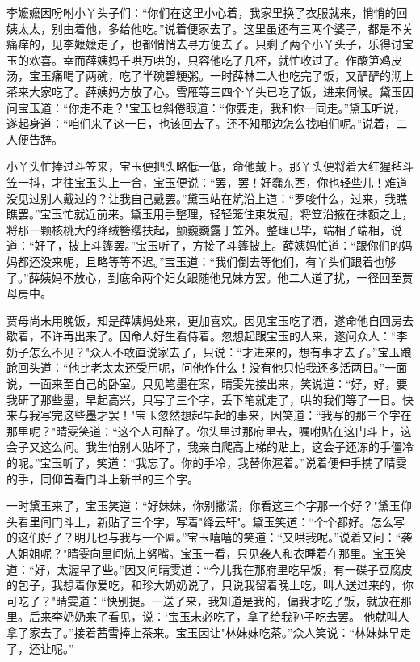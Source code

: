 李嬷嬷因吩咐小丫头子们：“你们在这里小心着，我家里换了衣服就来，悄悄的回姨太太，别由着他，多给他吃。”说着便家去了。这里虽还有三两个婆子，都是不关痛痒的，见李嬷嬷走了，也都悄悄去寻方便去了。只剩了两个小丫头子，乐得讨宝玉的欢喜。幸而薛姨妈千哄万哄的，只容他吃了几杯，就忙收过了。作酸笋鸡皮汤，宝玉痛喝了两碗，吃了半碗碧粳粥。一时薛林二人也吃完了饭，又酽酽的沏上茶来大家吃了。薛姨妈方放了心。雪雁等三四个丫头已吃了饭，进来伺候。黛玉因问宝玉道：“你走不走？"宝玉乜斜倦眼道：“你要走，我和你一同走。”黛玉听说，遂起身道：“咱们来了这一日，也该回去了。还不知那边怎么找咱们呢。”说着，二人便告辞。

小丫头忙捧过斗笠来，宝玉便把头略低一低，命他戴上。那丫头便将着大红猩毡斗笠一抖，才往宝玉头上一合，宝玉便说：“罢，罢！好蠢东西，你也轻些儿！难道没见过别人戴过的？让我自己戴罢。”黛玉站在炕沿上道：“罗唆什么，过来，我瞧瞧罢。”宝玉忙就近前来。黛玉用手整理，轻轻笼住束发冠，将笠沿掖在抹额之上，将那一颗核桃大的绛绒簪缨扶起，颤巍巍露于笠外。整理已毕，端相了端相，说道：“好了，披上斗篷罢。”宝玉听了，方接了斗篷披上。薛姨妈忙道：“跟你们的妈妈都还没来呢，且略等等不迟。”宝玉道：“我们倒去等他们，有丫头们跟着也够了。”薛姨妈不放心，到底命两个妇女跟随他兄妹方罢。他二人道了扰，一径回至贾母房中。

贾母尚未用晚饭，知是薛姨妈处来，更加喜欢。因见宝玉吃了酒，遂命他自回房去歇着，不许再出来了。因命人好生看侍着。忽想起跟宝玉的人来，遂问众人：“李奶子怎么不见？"众人不敢直说家去了，只说：“才进来的，想有事才去了。”宝玉踉跄回头道：“他比老太太还受用呢，问他作什么！没有他只怕我还多活两日。”一面说，一面来至自己的卧室。只见笔墨在案，晴雯先接出来，笑说道：“好，好，要我研了那些墨，早起高兴，只写了三个字，丢下笔就走了，哄的我们等了一日。快来与我写完这些墨才罢！"宝玉忽然想起早起的事来，因笑道：“我写的那三个字在那里呢？"晴雯笑道：“这个人可醉了。你头里过那府里去，嘱咐贴在这门斗上，这会子又这么问。我生怕别人贴坏了，我亲自爬高上梯的贴上，这会子还冻的手僵冷的呢。”宝玉听了，笑道：“我忘了。你的手冷，我替你渥着。”说着便伸手携了晴雯的手，同仰首看门斗上新书的三个字。

一时黛玉来了，宝玉笑道：“好妹妹，你别撒谎，你看这三个字那一个好？"黛玉仰头看里间门斗上，新贴了三个字，写着"绛云轩"。黛玉笑道：“个个都好。怎么写的这们好了？明儿也与我写一个匾。”宝玉嘻嘻的笑道：“又哄我呢。”说着又问：“袭人姐姐呢？"晴雯向里间炕上努嘴。宝玉一看，只见袭人和衣睡着在那里。宝玉笑道：“好，太渥早了些。”因又问晴雯道：“今儿我在那府里吃早饭，有一碟子豆腐皮的包子，我想着你爱吃，和珍大奶奶说了，只说我留着晚上吃，叫人送过来的，你可吃了？"晴雯道：“快别提。一送了来，我知道是我的，偏我才吃了饭，就放在那里。后来李奶奶来了看见，说：`宝玉未必吃了，拿了给我孙子吃去罢。-他就叫人拿了家去了。”接着茜雪捧上茶来。宝玉因让"林妹妹吃茶。”众人笑说：“林妹妹早走了，还让呢。”

